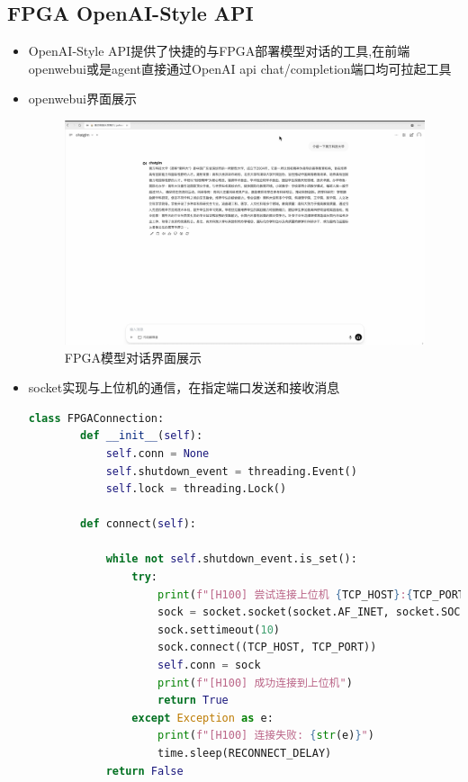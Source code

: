 \documentclass[AutoFakeBold,AutoFakeSlant,language=chinese,degree=bachelor]{sustechthesis}
\begin{document}
\subsection{FPGA OpenAI-Style API}
\begin{itemize}
    \item OpenAI-Style API提供了快捷的与FPGA部署模型对话的工具,在前端openwebui或是agent直接通过OpenAI api chat/completion端口均可拉起工具
        \item openwebui界面展示
            \begin{figure}[H]
                \centering
                \includegraphics[width=\textwidth]{./figures/openwebui_display.png}
                \caption{FPGA模型对话界面展示}
            \end{figure}
        \item socket实现与上位机的通信，在指定端口发送和接收消息
        \begin{lstlisting}[language=python]
        class FPGAConnection:
        def __init__(self):
            self.conn = None
            self.shutdown_event = threading.Event()
            self.lock = threading.Lock()

        def connect(self):

            while not self.shutdown_event.is_set():
                try:
                    print(f"[H100] 尝试连接上位机 {TCP_HOST}:{TCP_PORT}")
                    sock = socket.socket(socket.AF_INET, socket.SOCK_STREAM)
                    sock.settimeout(10)
                    sock.connect((TCP_HOST, TCP_PORT))
                    self.conn = sock
                    print(f"[H100] 成功连接到上位机")
                    return True
                except Exception as e:
                    print(f"[H100] 连接失败: {str(e)}")
                    time.sleep(RECONNECT_DELAY)
            return False


\end{lstlisting}
\end{itemize}
\end{document}
